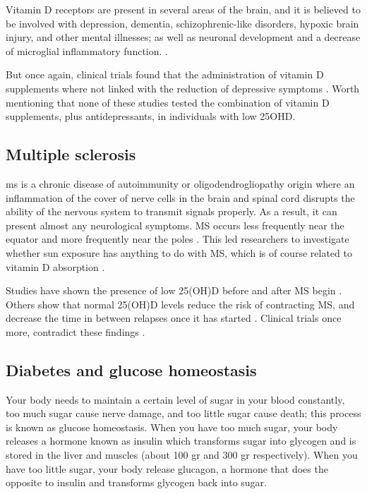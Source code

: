 Vitamin D receptors are present in several areas of the brain, and it is believed to be involved with depression, dementia, schizophrenic-like disorders, hypoxic brain injury, and other mental illnesses; as well as neuronal development and a decrease of microglial inflammatory function. \cite{ref:Anjum2018, ref:Holick2014, ref:Eyles2005, ref:Harms2011, ref:Anglin2013}.

But once again, clinical trials found that the administration of vitamin D supplements where not linked with the reduction of depressive symptoms \cite{ref:Gowda2015, ref:Jorde2018, ref:deKoning2019, ref:Jorde2019, ref:Okereke2020, }. Worth mentioning that none of these studies tested the combination of vitamin D supplements, plus antidepressants, in individuals with low 25OHD.


\subsection{Multiple sclerosis}

\gls{ms} is a chronic disease of autoimmunity or oligodendrogliopathy origin \cite{ref:Nakahara2011} where an inflammation of the cover of nerve cells in the brain and spinal cord disrupts the ability of the nervous system to transmit signals properly. As a result, it can present almost any neurological symptoms. MS occurs less frequently near the equator and more frequently near the poles \cite{ref:Jagannath2018}. This led researchers to investigate whether sun exposure has anything to do with MS, which is of course related to vitamin D absorption \cite{ref:Bouillon2021}.


Studies have shown the presence of low 25(OH)D before and after MS begin \cite{ref:Jagannath2018, ref:Munger2017, ref:Salzer2012, ref:Munger2006}. Others show that normal 25(OH)D levels reduce the risk of contracting MS, and decrease the time in between relapses once it has started \cite{ref:Sintzel2017}. Clinical trials once more, contradict these findings \cite{ref:Jagannath2018, ref:Marrie2017}.


\subsection{Diabetes and glucose homeostasis}

Your body needs to maintain a certain level of sugar in your blood constantly, too much sugar cause nerve damage, and too little sugar cause death; this process is known as glucose homeostasis. When you have too much sugar, your body releases a hormone known as insulin which transforms sugar into glycogen and is stored in the liver and muscles (about 100 gr and 300 gr respectively). When you have too little sugar, your body release glucagon, a hormone that does the opposite to insulin and transforms glycogen back into sugar.

